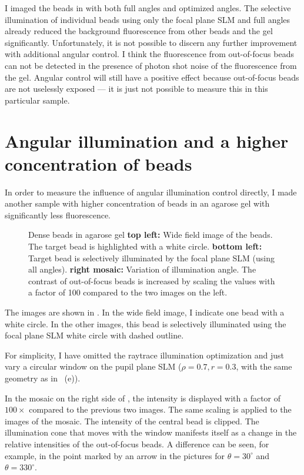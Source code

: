 I  imaged the
beads in  with both full angles and optimized
angles. The selective illumination of individual beads using
only the focal plane SLM and full angles already reduced the background
fluorescence from other beads and the gel
significantly. Unfortunately, it is not possible to discern any
further improvement with additional angular control.  I think the
fluorescence from out-of-focus beads can not be detected in the presence of photon
shot noise of the fluorescence from the gel. Angular control will
still have a positive effect because out-of-focus beads are not
uselessly exposed --- it is just not possible to measure this in this
particular sample.

\section{Angular illumination and a higher concentration of beads}
In order to measure the influence of angular illumination control
directly, I made another sample with higher concentration of beads in
an agarose gel with significantly less fluorescence.


\begin{figure}[!hbt]
  \centering
  \caption{Dense beads in agarose gel {\bf top left:} Wide field image
    of the beads. The target bead is highlighted with a white circle.
    {\bf bottom left:} Target bead is selectively illuminated by the
    focal plane SLM (using all angles).  {\bf right mosaic:} Variation
    of illumination angle. The contrast of out-of-focus beads is
    increased by scaling the values with a factor of 100 compared to
    the two images on the left.}
  \label{fig:montage-ang}
\end{figure}

The images are shown in . In the wide field
image, I indicate one bead with a white circle. In the other images,
this bead is selectively illuminated using the focal plane SLM white
circle with dashed outline.

For simplicity, I have omitted the raytrace illumination optimization
and just vary a circular window on the pupil plane SLM ($\rho=0.7,
r=0.3$, with the same geometry as in ~(e)).


In the mosaic on the right side of , the
intensity is displayed with a factor of $100\times$ compared to the
previous two images. The same scaling is applied to the images of the
mosaic. The intensity of the central bead is clipped. The illumination
cone that moves with the window manifests itself as a change in the
relative intensities of the out-of-focus beads. A difference can be
seen, for example, in the point marked by an arrow in the pictures for
$\theta=30^\circ$ and $\theta=330^\circ$.

